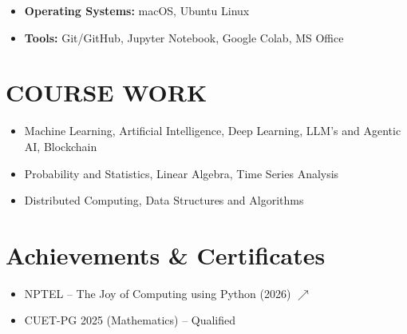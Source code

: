 \documentclass[a4paper,9pt]{article}
\begin{document}
\begin{minipage}[t]{0.37\textwidth}
\begin{itemize}[leftmargin=*,nosep]
\item \textbf{Operating Systems:} macOS, Ubuntu Linux

\item \textbf{Tools:} Git/GitHub, Jupyter Notebook, Google Colab, MS Office

\end{itemize}
\section{COURSE WORK}

\begin{itemize}[leftmargin=*,nosep]

\item Machine Learning, Artificial Intelligence, Deep Learning, LLM's and Agentic AI, Blockchain

\item Probability and Statistics, Linear Algebra, Time Series Analysis

\item Distributed Computing, Data Structures and Algorithms

\end{itemize}




\section{Achievements \& Certificates}
\begin{itemize}[leftmargin=*,nosep]
\item NPTEL -- The Joy of Computing using Python (2026)
{\tiny\href{https://nptel.ac.in/noc/E_Certificate/NPTEL26CS84S35430004004874981}{\color{myblue}$\nearrow$}}
\item CUET-PG 2025 (Mathematics) – Qualified
\end{itemize}

\end{minipage}
\end{document}
